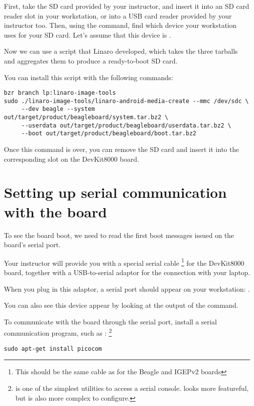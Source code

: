 First, take the SD card provided by your instructor, and insert it into an SD card reader slot
in your workstation, or into a USB card reader provided by your instructor too. Then,
using the  command, find which device your workstation uses for your SD card.
Let's assume that this device is . 

Now we can use a  script that Linaro developed,
which takes the three tarballs and aggregates them to produce a ready-to-boot SD card.

You can install this script with the following commands:

\begin{verbatim}
bzr branch lp:linaro-image-tools
sudo ./linaro-image-tools/linaro-android-media-create --mmc /dev/sdc \
     --dev beagle --system out/target/product/beagleboard/system.tar.bz2 \
     --userdata out/target/product/beagleboard/userdata.tar.bz2 \
     --boot out/target/product/beagleboard/boot.tar.bz2
\end{verbatim}

Once this command is over, you can remove the SD card and insert it
into the corresponding slot on the DevKit8000 board.

\section{Setting up serial communication with the board}

To see the board boot, we need to read the first boot messages 
issued on the board's serial port.

Your instructor will provide you with a special serial cable
\footnote{This should be the same cable as for the Beagle and IGEPv2 boards}
for the DevKit8000 board, together with a USB-to-serial adaptor for the connection
with your laptop.

When you plug in this adaptor, a serial port should appear on your workstation:
.

You can also see this device appear by looking at the output of the \code{dmesg}
command.

To communicate with the board through the serial port, install a
serial communication program, such as :
\footnote{ is one of the simplest utilities to access
a serial console. \code{minicom} looks more featureful, but is also
more complex to configure.}

\begin{verbatim}
sudo apt-get install picocom
\end{verbatim}

